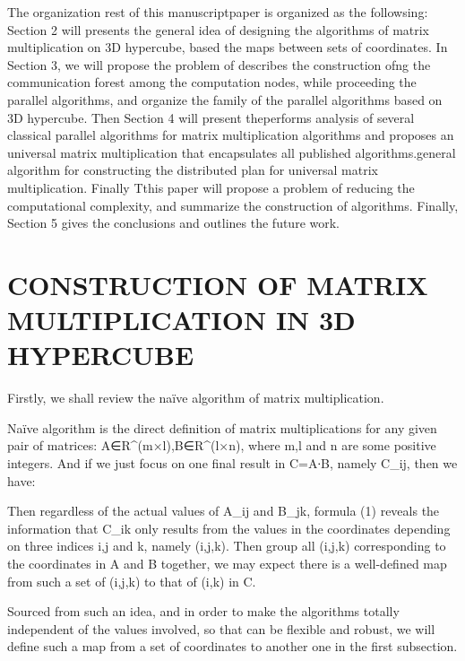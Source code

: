 \documentclass{amsart}
\theoremstyle{definition}
\theoremstyle{remark}
\numberwithin{equation}{section}
\begin{document}
	The organization rest of this manuscriptpaper is organized as the followsing: Section 2 will presents the general idea of designing the algorithms of matrix multiplication on 3D hypercube, based the maps between sets of coordinates. In Section 3, we will propose the problem of describes the construction ofng the communication forest among the computation nodes, while proceeding the parallel algorithms, and organize the family of the parallel algorithms based on 3D hypercube. Then Section 4 will present theperforms analysis of several classical parallel algorithms for matrix multiplication algorithms and proposes an universal matrix multiplication that encapsulates all published algorithms.general algorithm for constructing the distributed plan for universal matrix multiplication. Finally Tthis paper will propose a problem of reducing the computational complexity, and summarize the construction of algorithms. Finally, Section 5 gives the conclusions and outlines the future work.
	
		
	


	\section{CONSTRUCTION OF MATRIX MULTIPLICATION IN 3D HYPERCUBE}
	
	Firstly, we shall review the naïve algorithm of matrix multiplication.
	
	Naïve algorithm is the direct definition of matrix multiplications for any given pair of matrices: A∈R^(m×l),B∈R^(l×n), where m,l and n are some positive integers. And if we just focus on one final result in C=A∙B, namely C_ij, then we have:
	
	Then regardless of the actual values of A_ij and B_jk, formula (1) reveals the information that C_ik only results from the values in the coordinates depending on three indices i,j and k, namely (i,j,k). Then group all (i,j,k) corresponding to the coordinates in A and B together, we may expect there is a well-defined map from such a set of (i,j,k) to that of (i,k) in C.
	
	Sourced from such an idea, and in order to make the algorithms totally independent of the values involved, so that can be flexible and robust, we will define such a map from a set of coordinates to another one in the first subsection.
		
\end{document}
